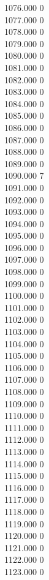 { 1076.000	0 \\
 1077.000	0 \\
 1078.000	0 \\
 1079.000	0 \\
 1080.000	0 \\
 1081.000	0 \\
 1082.000	0 \\
 1083.000	0 \\
 1084.000	0 \\
 1085.000	0 \\
 1086.000	0 \\
 1087.000	0 \\
 1088.000	0 \\
 1089.000	0 \\
 1090.000	7 \\
 1091.000	0 \\
 1092.000	0 \\
 1093.000	0 \\
 1094.000	0 \\
 1095.000	0 \\
 1096.000	0 \\
 1097.000	0 \\
 1098.000	0 \\
 1099.000	0 \\
 1100.000	0 \\
 1101.000	0 \\
 1102.000	0 \\
 1103.000	0 \\
 1104.000	0 \\
 1105.000	0 \\
 1106.000	0 \\
 1107.000	0 \\
 1108.000	0 \\
 1109.000	0 \\
 1110.000	0 \\
 1111.000	0 \\
 1112.000	0 \\
 1113.000	0 \\
 1114.000	0 \\
 1115.000	0 \\
 1116.000	0 \\
 1117.000	0 \\
 1118.000	0 \\
 1119.000	0 \\
 1120.000	0 \\
 1121.000	0 \\
 1122.000	0 \\
 1123.000	0 \\
}

